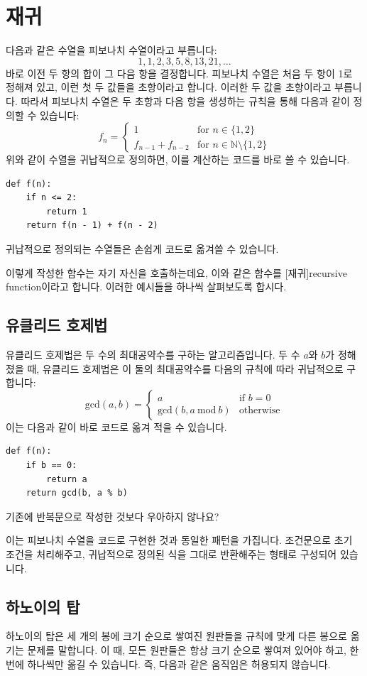 \documentclass[../main.tex]{subfiles}
\begin{document}
\section{재귀}
다음과 같은 수열을 피보나치 수열이라고 부릅니다:
\[
1, 1, 2, 3, 5, 8, 13, 21, \dots
\]
바로 이전 두 항의 합이 그 다음 항을 결정합니다.
피보나치 수열은 처음 두 항이 1로 정해져 있고, 이런 첫 두 값들을 초항이라고 합니다.
이러한 두 값을 초항이라고 부릅니다.
따라서 피보나치 수열은 두 초항과 다음 항을 생성하는 규칙을 통해 다음과 같이 정의할 수 있습니다:
\[
f_n = \begin{cases}
1 & \text{for $n \in \{1, 2\}$}\\
f_{n - 1} + f_{n - 2} & \text{for $n \in \mathbb{N} \setminus \{1, 2\}$}
\end{cases}
\]
위와 같이 수열을 귀납적으로 정의하면, 이를 계산하는 코드를 바로 쓸 수 있습니다.
\begin{verbatim}
def f(n):
    if n <= 2:
        return 1
    return f(n - 1) + f(n - 2)
\end{verbatim}
귀납적으로 정의되는 수열들은 손쉽게 코드로 옮겨쓸 수 있습니다.

이렇게 작성한 함수는 자기 자신을 호출하는데요, 이와 같은 함수를 [재귀]{recursive function}이라고 합니다.
이러한 예시들을 하나씩 살펴보도록 합시다.

\subsection{유클리드 호제법}
유클리드 호제법은 두 수의 최대공약수를 구하는 알고리즘입니다.
두 수 $a$와 $b$가 정해졌을 때, 유클리드 호제법은 이 둘의 최대공약수를 다음의 규칙에 따라 귀납적으로 구합니다:
\[
\mathrm{gcd}(a, b) = \begin{cases}
a & \text{if }b = 0\\
\mathrm{gcd}(b, a\ \mathrm{mod}\ b) & \text{otherwise}
\end{cases}
\]
이는 다음과 같이 바로 코드로 옮겨 적을 수 있습니다.
\begin{verbatim}
def f(n):
    if b == 0:
        return a
    return gcd(b, a % b)
  \end{verbatim}
기존에 반복문으로 작성한 것보다 우아하지 않나요?

이는 피보나치 수열을 코드로 구현한 것과 동일한 패턴을 가집니다.
조건문으로 초기 조건을 처리해주고, 귀납적으로 정의된 식을 그대로 반환해주는 형태로 구성되어 있습니다.

\subsection{하노이의 탑}
하노이의 탑은 세 개의 봉에 크기 순으로 쌓여진 원판들을 규칙에 맞게 다른 봉으로 옮기는 문제를 말합니다.
이 때, 모든 원판들은 항상 크기 순으로 쌓여져 있어야 하고, 한 번에 하나씩만 옮길 수 있습니다.
즉, 다음과 같은 움직임은 허용되지 않습니다.
\end{document}
